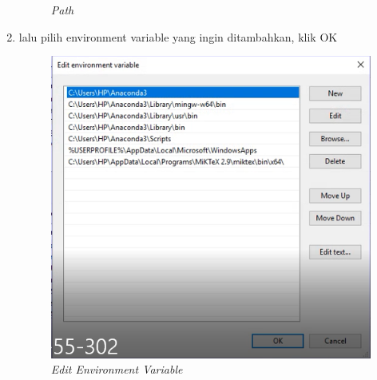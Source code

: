 \begin{enumerate}
\begin{figure}[H]
    \caption{\textit{Path}}
    \label{Environment4}
\end{figure}
\item lalu pilih environment variable yang ingin ditambahkan, klik OK
\begin{figure}[H]
    \centering
    \includegraphics[scale=0.4]{figures/ok}
    \caption{\textit{Edit Environment Variable}}
    \label{Environment5}
\end{figure}
\end{enumerate}

